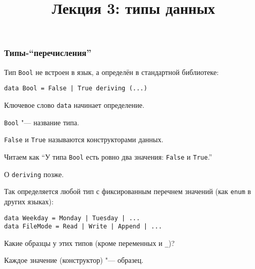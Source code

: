\documentclass[10pt]{beamer}
\title{Лекция 3: типы данных}
\begin{document}
\begin{frame}[plain]
\maketitle
\end{frame}

\begin{frame}[fragile]
\frametitle{Типы-\enquote{перечисления}}
\begin{itemize}
    \item Тип \lstinline|Bool| не встроен в язык, а определён в стандартной библиотеке:
\begin{lstlisting}
data Bool = False | True deriving (...)
\end{lstlisting}
    \item Ключевое слово \lstinline|data| начинает определение.
    \item \lstinline|Bool| "--- название типа.
    \item \lstinline|False| и \lstinline|True| называются конструкторами данных.
    \item Читаем как \enquote{У типа \lstinline|Bool| есть ровно два значения: \lstinline|False| и \lstinline|True|.} 
     { \item О \lstinline|deriving| позже. }
    \pause
    \item Так определяется любой тип с фиксированным перечнем значений (как \lstinline|enum| в других языках):
\begin{lstlisting}
data Weekday = Monday | Tuesday | ...
data FileMode = Read | Write | Append | ...
\end{lstlisting}
    \item Какие образцы у этих типов (кроме переменных и \lstinline|_|)? \pause
    \item Каждое значение (конструктор) "--- образец.
\end{itemize}
\end{frame}
\end{document}
